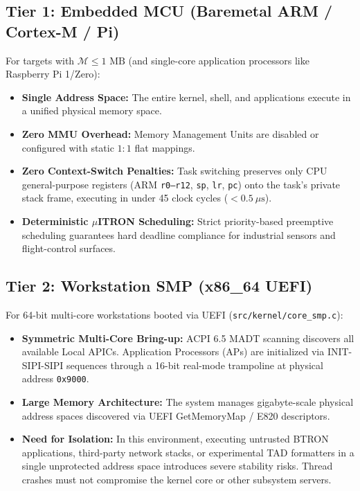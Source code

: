 \documentclass[10pt,journal,compsoc,twocolumn]{article}
\begin{document}
\subsection{Tier 1: Embedded MCU (Baremetal ARM / Cortex-M / Pi)}
For targets with $\mathcal{M} \le 1\text{ MB}$ (and single-core application processors like Raspberry Pi 1/Zero):
\begin{itemize}[leftmargin=*]
    \item \textbf{Single Address Space:} The entire kernel, shell, and applications execute in a unified physical memory space.
    \item \textbf{Zero MMU Overhead:} Memory Management Units are disabled or configured with static $1:1$ flat mappings.
    \item \textbf{Zero Context-Switch Penalties:} Task switching preserves only CPU general-purpose registers (ARM \texttt{r0--r12}, \texttt{sp}, \texttt{lr}, \texttt{pc}) onto the task's private stack frame, executing in under 45 clock cycles ($< 0.5\ \mu\text{s}$).
    \item \textbf{Deterministic $\mu$ITRON Scheduling:} Strict priority-based preemptive scheduling guarantees hard deadline compliance for industrial sensors and flight-control surfaces.
\end{itemize}

\subsection{Tier 2: Workstation SMP (x86\_64 UEFI)}
For 64-bit multi-core workstations booted via UEFI (\texttt{src/kernel/core\_smp.c}):
\begin{itemize}[leftmargin=*]
    \item \textbf{Symmetric Multi-Core Bring-up:} ACPI 6.5 MADT scanning discovers all available Local APICs. Application Processors (APs) are initialized via INIT-SIPI-SIPI sequences through a 16-bit real-mode trampoline at physical address \texttt{0x9000}.
    \item \textbf{Large Memory Architecture:} The system manages gigabyte-scale physical address spaces discovered via UEFI GetMemoryMap / E820 descriptors.
    \item \textbf{Need for Isolation:} In this environment, executing untrusted BTRON applications, third-party network stacks, or experimental TAD formatters in a single unprotected address space introduces severe stability risks. Thread crashes must not compromise the kernel core or other subsystem servers.
\end{itemize}
\end{document}
